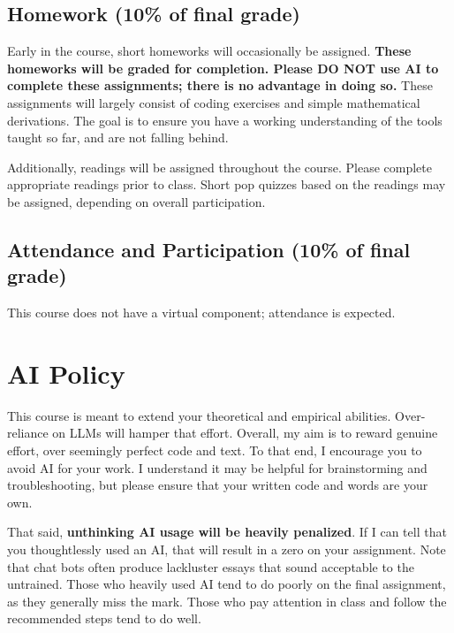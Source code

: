 \documentclass[11 pt]{article}
\begin{document}
\subsection*{Homework (10\% of final grade)}

Early in the course, short homeworks will occasionally be assigned. 
\textbf{These homeworks will be graded for completion. Please DO NOT use AI to complete these assignments; there is no advantage in doing so.}
These assignments will largely consist of coding exercises and simple mathematical derivations. 
The goal is to ensure you have a working understanding of the tools taught so far, and are not falling behind.


Additionally, readings will be assigned throughout the course. 
Please complete appropriate readings prior to class.
Short pop quizzes based on the readings may be assigned, depending on overall participation. 

\subsection*{Attendance and Participation (10\% of final grade)}

This course does not have a virtual component; attendance is expected.

\section*{AI Policy}

This course is meant to extend your theoretical and empirical abilities. 
Over-reliance on LLMs will hamper that effort. 
Overall, my aim is to reward genuine effort, over seemingly perfect code and text. 
To that end, I encourage you to avoid AI for your work. 
I understand it may be helpful for brainstorming and troubleshooting, but please ensure that your written code and words are your own.

That said, \textbf{unthinking AI usage will be heavily penalized}. If I can tell that you thoughtlessly used an AI, that will result in a zero on your assignment. Note that chat bots often produce lackluster essays that sound acceptable to the untrained. Those who heavily used AI tend to do poorly on the final assignment, as they generally miss the mark. Those who pay attention in class and follow the recommended steps tend to do well. 
\end{document}
